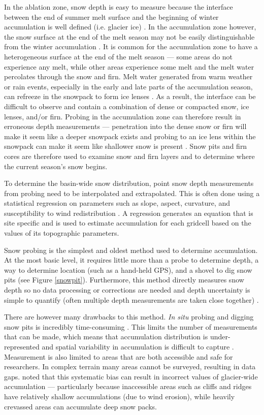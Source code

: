\documentclass{sfuthesis}
\begin{document}
In the ablation zone, snow depth is easy to measure because the interface between the end of summer melt surface and the beginning of winter accumulation is well defined (i.e. glacier ice) \citep{McGrath2015}. In the accumulation zone however, the snow surface at the end of the melt season may not be easily distinguishable from the winter accumulation \citep{Grunewald2010}. It is common for the accumulation zone to have a heterogeneous surface at the end of the melt season --- some areas do not experience any melt,  while other areas experience some melt and the melt water percolates through the snow and firn. Melt water generated from warm weather or rain events, especially in the early and late parts of the accumulation season, can refreeze in the snowpack to form ice lenses \citep{Sold2014}. As a result, the interface can be difficult to observe and contain a combination of dense or compacted snow, ice lenses, and/or firn.  Probing in the accumulation zone can therefore result in erroneous depth measurements --- penetration into the dense snow or firn will make it seem like a deeper snowpack exists and probing to an ice lens within the snowpack can make it seem like shallower snow is present \citep{Sold2013}. Snow pits and firn cores are therefore used to examine snow and firn layers and to determine where the current season's snow begins.

To determine the basin-wide snow distribution, point snow depth measurements from probing need to be interpolated and extrapolated. This is often done using a statistical regression on parameters such as slope, aspect, curvature, and susceptibility to wind redistribution \citep[e.g.][]{Wheler2014,McGrath2015}. A regression generates an equation that is site specific and is used to estimate accumulation for each gridcell based on the values of its topographic parameters. 

Snow probing is the simplest and oldest method used to determine accumulation. At the most basic level, it requires little more than a probe to determine depth, a way to determine location (such as a hand-held GPS), and a shovel to dig snow pits (see Figure \ref{snowpit}). Furthermore, this method directly measures snow depth so no data processing or corrections are needed and depth uncertainty is simple to quantify (often multiple depth measurements are taken close together) \citep{Sold2013}. 

There are however many drawbacks to this method. \textit{In situ} probing and digging snow pits is incredibly time-consuming \citep{Deems2006}. This limits the number of measurements that can be made, which means that accumulation distribution is under-represented and spatial variability in accumulation is difficult to capture \citep{Sold2014}. Measurement is also limited to areas that are both accessible and safe for researchers. In complex terrain many areas cannot be surveyed, resulting in data gaps. \cite{Sold2013} noted that this systematic bias can result in incorrect values of glacier-wide accumulation --- particularly because inaccessible areas such as cliffs and ridges have relatively shallow accumulations (due to wind erosion), while heavily crevassed areas can accumulate deep snow packs. 
\end{document}
